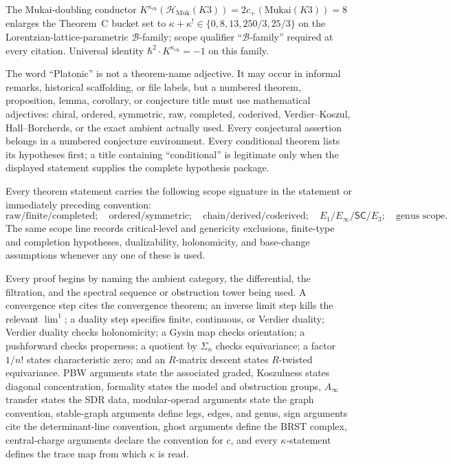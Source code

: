 \begin{remark}
\label{rem:const-theoremC-enlargement}
The Mukai-doubling conductor $K^{\kappa_{\mathrm{ch}}}(\mathcal{H}_{\mathrm{Muk}}(K3))
= 2 c_+(\mathrm{Mukai}(K3)) = 8$ enlarges the Theorem~C bucket set to
$\kappa + \kappa^! \in \{0, 8, 13, 250/3, 25/3\}$ on the Lorentzian-lattice-parametric
$\mathcal{B}$-family; scope qualifier ``$\mathcal{B}$-family'' required at every citation.
Universal identity $\hbar^2 \cdot K^{\kappa_{\mathrm{ch}}} = -1$ on this family.
\end{remark}

\begin{convention}
\label{conv:const-theorem-proof-obligation-gate}
The word ``Platonic'' is not a theorem-name adjective.  It may occur in
informal remarks, historical scaffolding, or file labels, but a
numbered theorem, proposition, lemma, corollary, or conjecture title
must use mathematical adjectives: chiral, ordered, symmetric, raw,
completed, coderived, Verdier--Koszul, Hall--Borcherds, or the exact
ambient actually used.  Every conjectural assertion belongs in a
numbered conjecture environment.  Every conditional theorem lists its
hypotheses first; a title containing ``conditional'' is legitimate only
when the displayed statement supplies the complete hypothesis package.

Every theorem statement carries the following scope signature in the
statement or immediately preceding convention:
\[
\text{raw/finite/completed};\quad
\text{ordered/symmetric};\quad
\text{chain/derived/coderived};\quad
E_1/E_\infty/\mathsf{SC}/E_3;\quad
\text{genus scope}.
\]
The same scope line records critical-level and genericity exclusions,
finite-type and completion hypotheses, dualizability, holonomicity, and
base-change assumptions whenever any one of these is used.

Every proof begins by naming the ambient category, the differential,
the filtration, and the spectral sequence or obstruction tower being
used.  A convergence step cites the convergence theorem; an inverse
limit step kills the relevant \(\lim^1\); a duality step specifies
finite, continuous, or Verdier duality; Verdier duality checks
holonomicity; a Gysin map checks orientation; a pushforward checks
properness; a quotient by \(\Sigma_n\) checks equivariance; a factor
\(1/n!\) states characteristic zero; and an \(R\)-matrix descent states
\(R\)-twisted equivariance.  PBW arguments state the associated graded,
Koszulness states diagonal concentration, formality states the model
and obstruction groups, \(A_\infty\) transfer states the SDR data,
modular-operad arguments state the graph convention, stable-graph
arguments define legs, edges, and genus, sign arguments cite the
determinant-line convention, ghost arguments define the BRST complex,
central-charge arguments declare the convention for \(c\), and every
\(\kappa\)-statement defines the trace map from which \(\kappa\) is
read.


\end{convention}
